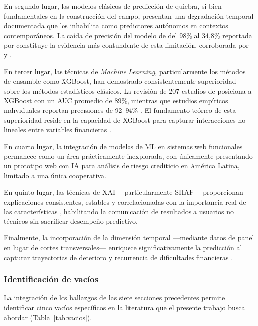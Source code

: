 \documentclass[12pt, letterpaper]{article}
\begin{document}
En segundo lugar, los modelos cl\'asicos de predicci\'on de quiebra, si bien fundamentales en la construcci\'on del campo, presentan una degradaci\'on temporal documentada que los inhabilita como predictores aut\'onomos en contextos contempor\'aneos. La ca\'ida de precisi\'on del modelo de \citet{Ohlson1980} del 98\% al 34,8\% reportada por \citet{Grice2003} constituye la evidencia m\'as contundente de esta limitaci\'on, corroborada por \citet{Bouwmeester2020} y \citet{Papadouli2024}.

En tercer lugar, las t\'ecnicas de \textit{Machine Learning}, particularmente los m\'etodos de ensamble como XGBoost, han demostrado consistentemente superioridad sobre los m\'etodos estad\'isticos cl\'asicos. La revisi\'on de 207 estudios de \citet{Dasilas2024} posiciona a XGBoost con un AUC promedio de 89\%, mientras que estudios emp\'iricos individuales reportan precisiones de 92--94\% \citep{Boumhidi2025, Yufenyuy2024, Mahesh2025}. El fundamento te\'orico de esta superioridad reside en la capacidad de XGBoost para capturar interacciones no lineales entre variables financieras \citep{ChenGuestrin2016}.

En cuarto lugar, la integraci\'on de modelos de ML en sistemas web funcionales permanece como un \'area pr\'acticamente inexplorada, con \'unicamente \citet{MayorgaLira2023} presentando un prototipo web con IA para an\'alisis de riesgo crediticio en Am\'erica Latina, limitado a una \'unica cooperativa.

En quinto lugar, las t\'ecnicas de XAI ---particularmente SHAP--- proporcionan explicaciones consistentes, estables y correlacionadas con la importancia real de las caracter\'isticas \citep{Pathi2025, Lin2024, Bussmann2020}, habilitando la comunicaci\'on de resultados a usuarios no t\'ecnicos sin sacrificar desempe\~no predictivo.

Finalmente, la incorporaci\'on de la dimensi\'on temporal ---mediante datos de panel en lugar de cortes transversales--- enriquece significativamente la predicci\'on al capturar trayectorias de deterioro y recurrencia de dificultades financieras \citep{Zhou2022, Zhang2025}.

\subsubsection{Identificaci\'on de vac\'ios}

La integraci\'on de los hallazgos de las siete secciones precedentes permite identificar cinco vac\'ios espec\'ificos en la literatura que el presente trabajo busca abordar (Tabla~\ref{tab:vacios}).
\end{document}
